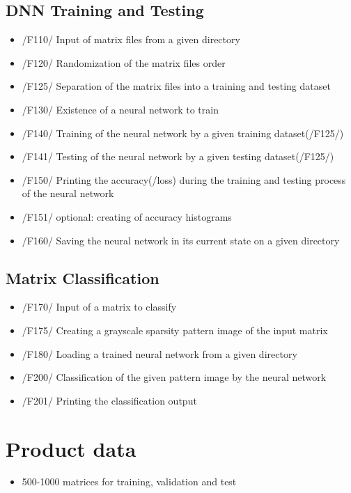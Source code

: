 \documentclass[parskip=full]{scrartcl}
\begin{document}
\subsection{DNN Training and Testing}
	\begin{itemize}
	\item /F110/ Input of matrix files from a given directory
	\item /F120/ Randomization of the matrix files order
	\item /F125/ Separation of the matrix files into a training and testing dataset
	\item /F130/ Existence of a neural network to train
	\item /F140/ Training of the neural network by a given training dataset(/F125/)
	\item /F141/ Testing of the neural network by a given testing dataset(/F125/)
	\item /F150/ Printing the accuracy(/loss) during the training and testing process of the neural network
	\item /F151/ optional: creating of accuracy histograms
	\item /F160/ Saving the neural network in its current state on a given directory
	\end{itemize}
 	
\subsection{Matrix Classification}
	\begin{itemize}
	\item /F170/ Input of a matrix to classify
	\item /F175/ Creating a grayscale sparsity pattern image of the input matrix
	\item /F180/ Loading a trained neural network from a given directory
	\item /F200/ Classification of the given pattern image by the neural network
	\item /F201/ Printing the classification output
	\end{itemize}

\section{Product data}
	\begin{itemize}
	\item 500-1000 matrices for training, validation and test
	\end{itemize}
\end{document}
